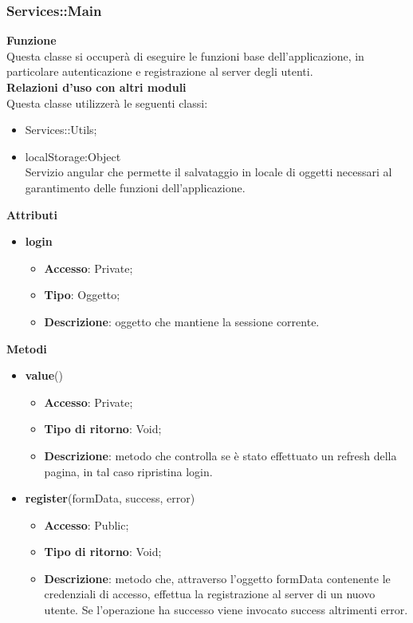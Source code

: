 \subsubsection{Services::Main}{
		\label{sub:servicesMain}
		\textbf{Funzione}\\
		\indent Questa classe si occuperà di eseguire le funzioni base dell'applicazione, in particolare autenticazione e registrazione al server degli utenti.\\
		\textbf{Relazioni d'uso con altri moduli}\\
		\indent Questa classe utilizzerà le seguenti classi:
		\begin{itemize}
			\item Services::Utils;
			\item localStorage:Object\\
				\indent Servizio angular che permette il salvataggio in locale di oggetti necessari al garantimento delle funzioni dell'applicazione.
		\end{itemize}
		\textbf{Attributi}
		\begin{itemize}
			\item \textbf{login}
			\begin{itemize}
				\item \textbf{Accesso}: Private;
				\item \textbf{Tipo}: Oggetto;
				\item \textbf{Descrizione}: oggetto che mantiene la sessione corrente.
			\end{itemize}
		\end{itemize}
		\textbf{Metodi}
		\begin{itemize}
			\item \textbf{value}()
			\begin{itemize}
				\item \textbf{Accesso}: Private;
				\item \textbf{Tipo di ritorno}: Void;
				\item \textbf{Descrizione}: metodo che controlla se è stato effettuato un refresh della pagina, in tal caso ripristina login.
			\end{itemize}
			\item \textbf{register}(formData, success, error)
			\begin{itemize}
				\item \textbf{Accesso}: Public;
				\item \textbf{Tipo di ritorno}: Void;
				\item \textbf{Descrizione}: metodo che, attraverso l'oggetto formData contenente le credenziali di accesso, effettua la registrazione al server di un nuovo utente. Se l'operazione ha successo viene invocato success altrimenti error.

\end{itemize}
\end{itemize}}
